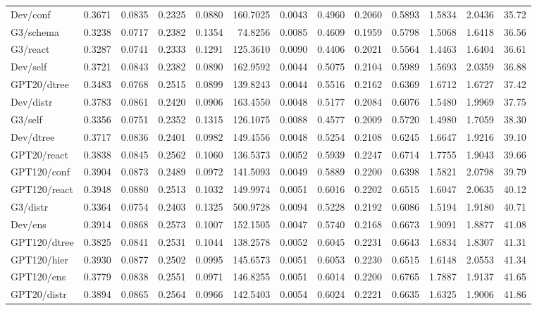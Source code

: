 \begin{table}[t]
\begin{tabular}{lrrrrrrrrrrrr}
Dev/conf & 0.3671 & 0.0835 & 0.2325 & 0.0880 & 160.7025 & 0.0043 & 0.4960 & 0.2060 & 0.5893 & 1.5834 & 2.0436 & 35.72 \\
G3/schema & 0.3238 & 0.0717 & 0.2382 & 0.1354 & 74.8256 & 0.0085 & 0.4609 & 0.1959 & 0.5798 & 1.5068 & 1.6418 & 36.56 \\
G3/react & 0.3287 & 0.0741 & 0.2333 & 0.1291 & 125.3610 & 0.0090 & 0.4406 & 0.2021 & 0.5564 & 1.4463 & 1.6404 & 36.61 \\
Dev/self & 0.3721 & 0.0843 & 0.2382 & 0.0890 & 162.9592 & 0.0044 & 0.5075 & 0.2104 & 0.5989 & 1.5693 & 2.0359 & 36.88 \\
GPT20/dtree & 0.3483 & 0.0768 & 0.2515 & 0.0899 & 139.8243 & 0.0044 & 0.5516 & 0.2162 & 0.6369 & 1.6712 & 1.6727 & 37.42 \\
Dev/distr & 0.3783 & 0.0861 & 0.2420 & 0.0906 & 163.4550 & 0.0048 & 0.5177 & 0.2084 & 0.6076 & 1.5480 & 1.9969 & 37.75 \\
G3/self & 0.3356 & 0.0751 & 0.2352 & 0.1315 & 126.1075 & 0.0088 & 0.4577 & 0.2009 & 0.5720 & 1.4980 & 1.7059 & 38.30 \\
Dev/dtree & 0.3717 & 0.0836 & 0.2401 & 0.0982 & 149.4556 & 0.0048 & 0.5254 & 0.2108 & 0.6245 & 1.6647 & 1.9216 & 39.10 \\
GPT20/react & 0.3838 & 0.0845 & 0.2562 & 0.1060 & 136.5373 & 0.0052 & 0.5939 & 0.2247 & 0.6714 & 1.7755 & 1.9043 & 39.66 \\
GPT120/conf & 0.3904 & 0.0873 & 0.2489 & 0.0972 & 141.5093 & 0.0049 & 0.5889 & 0.2200 & 0.6398 & 1.5821 & 2.0798 & 39.79 \\
GPT120/react & 0.3948 & 0.0880 & 0.2513 & 0.1032 & 149.9974 & 0.0051 & 0.6016 & 0.2202 & 0.6515 & 1.6047 & 2.0635 & 40.12 \\
G3/distr & 0.3364 & 0.0754 & 0.2403 & 0.1325 & 500.9728 & 0.0094 & 0.5228 & 0.2192 & 0.6086 & 1.5194 & 1.9180 & 40.71 \\
Dev/ens & 0.3914 & 0.0868 & 0.2573 & 0.1007 & 152.1505 & 0.0047 & 0.5740 & 0.2168 & 0.6673 & 1.9091 & 1.8877 & 41.08 \\
GPT120/dtree & 0.3825 & 0.0841 & 0.2531 & 0.1044 & 138.2578 & 0.0052 & 0.6045 & 0.2231 & 0.6643 & 1.6834 & 1.8307 & 41.31 \\
GPT120/hier & 0.3930 & 0.0877 & 0.2502 & 0.0995 & 145.6573 & 0.0051 & 0.6053 & 0.2230 & 0.6515 & 1.6148 & 2.0553 & 41.34 \\
GPT120/ens & 0.3779 & 0.0838 & 0.2551 & 0.0971 & 146.8255 & 0.0051 & 0.6014 & 0.2200 & 0.6765 & 1.7887 & 1.9137 & 41.65 \\
GPT20/distr & 0.3894 & 0.0865 & 0.2564 & 0.0966 & 142.5403 & 0.0054 & 0.6024 & 0.2221 & 0.6635 & 1.6325 & 1.9006 & 41.86 \\

\end{tabular}
\end{table}
